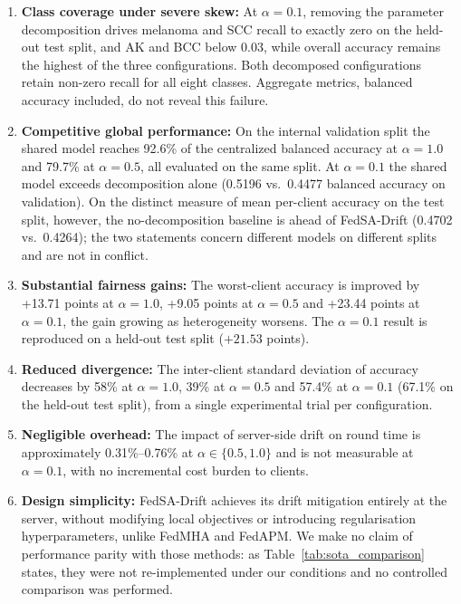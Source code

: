 \documentclass[utf8]{FrontiersinHarvard} %
\newcommand{\sadrift}{FedSA-Drift}
\begin{document}
\begin{enumerate}
    \item \textbf{Class coverage under severe skew:} At $\alpha{=}0.1$, removing the parameter decomposition drives melanoma and SCC recall to exactly zero on the held-out test split, and AK and BCC below 0.03, while overall accuracy remains the highest of the three configurations. Both decomposed configurations retain non-zero recall for all eight classes. Aggregate metrics, balanced accuracy included, do not reveal this failure.
    \item \textbf{Competitive global performance:} On the internal validation split the shared model reaches 92.6\% of the centralized balanced accuracy at $\alpha{=}1.0$ and 79.7\% at $\alpha{=}0.5$, all evaluated on the same split. At $\alpha{=}0.1$ the shared model exceeds decomposition alone (0.5196 vs.\ 0.4477 balanced accuracy on validation). On the distinct measure of mean per-client accuracy on the test split, however, the no-decomposition baseline is ahead of \sadrift{} (0.4702 vs.\ 0.4264); the two statements concern different models on different splits and are not in conflict.
    \item \textbf{Substantial fairness gains:} The worst-client accuracy is improved by +13.71 points at $\alpha{=}1.0$, +9.05 points at $\alpha{=}0.5$ and +23.44 points at $\alpha{=}0.1$, the gain growing as heterogeneity worsens. The $\alpha{=}0.1$ result is reproduced on a held-out test split ($+21.53$ points).
    \item \textbf{Reduced divergence:} The inter-client standard deviation of accuracy decreases by 58\% at $\alpha{=}1.0$, 39\% at $\alpha{=}0.5$ and 57.4\% at $\alpha{=}0.1$ (67.1\% on the held-out test split), from a single experimental trial per configuration.
    \item \textbf{Negligible overhead:} The impact of server-side drift on round time is approximately 0.31\%--0.76\% at $\alpha \in \{0.5, 1.0\}$ and is not measurable at $\alpha{=}0.1$, with no incremental cost burden to clients.
    \item \textbf{Design simplicity:} \sadrift{} achieves its drift mitigation entirely at the server, without modifying local objectives or introducing regularisation hyperparameters, unlike FedMHA and FedAPM. We make no claim of performance parity with those methods: as Table~\ref{tab:sota_comparison} states, they were not re-implemented under our conditions and no controlled comparison was performed.
\end{enumerate}
\end{document}
